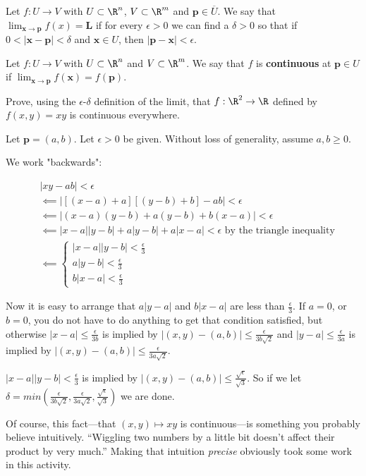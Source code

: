 \documentclass{ximera}
\begin{document}
\begin{definition}
	Let $f:U \to  V$  with $U \subset \R^n$, $V \subset \R^m$ and $\mathbf{p} \in \overline{U}$.  We say that $\lim_{\mathbf{x} \to \mathbf{p}}f(x) = \mathbf{L}$ if for every $\epsilon >0$ we can find a 
	$\delta>0$ so that if $0<|\mathbf{x}-\mathbf{p}|<\delta$ and $\mathbf{x} \in U$, then $|\mathbf{p}-\mathbf{x}|<\epsilon$.
\end{definition}

\begin{definition}
	 Let $f:U \to  V$  with $U \subset \R^n$ and $V \subset \R^m$.  We say that $f$ is \textbf{continuous} at $\mathbf{p} \in U$ if $\lim_{\mathbf{x} \to \mathbf{p}} f(\mathbf{x}) = f(\mathbf{p})$. 
\end{definition}

Prove, using the $\epsilon$-$\delta$ definition of the limit, that $f:\R^2 \to \R$ defined by $f(x,y) = xy$ is continuous everywhere.

\begin{free-response}
	Let $\mathbf{p} = (a,b)$.   Let $\epsilon>0$ be given.  Without loss of generality, assume $a,b \geq 0$.
	
	We work "backwards":
	
	\begin{align*}
		&|xy-ab|<\epsilon\\
		&\impliedby |[(x-a)+a][(y-b)+b]-ab| <\epsilon \\
		&\impliedby |(x-a)(y-b)+a(y-b) +b(x-a)| <\epsilon \\
		&\impliedby |x-a||y-b|+a|y-b|+a|x-a|< \epsilon \text{ by the triangle inequality}\\
		&\impliedby \begin{cases}
			|x-a||y-b| < \frac{\epsilon}{3}\\
			a|y-b| < \frac{\epsilon}{3}\\
			b|x-a| < \frac{\epsilon}{3}
			\end{cases}
	\end{align*}
	
	Now it is easy to arrange that $a|y-a|$  and $b|x-a|$ are less than $\frac{\epsilon}{3}$.  If $a=0$, or $b=0$, 
	you do not have to do anything to get that condition satisfied, but otherwise $|x-a| \leq \frac{\epsilon}{3b}$ is implied by $|(x,y) - (a,b)| \leq \frac{\epsilon}{3b\sqrt{2}}$
	and  $|y-a| \leq \frac{\epsilon}{3a}$ is implied by $|(x,y) - (a,b)| \leq \frac{\epsilon}{3a\sqrt{2}}$.
	
	$|x-a||y-b| < \frac{\epsilon}{3}$ is implied by $|(x,y)-(a,b)| \leq \frac{\sqrt{\epsilon}}{\sqrt{3}}$.  
	So if we let $\delta = min(\frac{\epsilon}{3b\sqrt{2}}, \frac{\epsilon}{3a\sqrt{2}}, \frac{\sqrt{\epsilon}}{\sqrt{3}})$ 
	we are done.
\end{free-response}

Of course, this fact---that $(x,y) \mapsto xy$ is continuous---is something you probably believe intuitively.  ``Wiggling two numbers by a little bit doesn't affect their product by very much.''  Making that intuition \textit{precise} obviously took some work in this activity.
\end{document}

